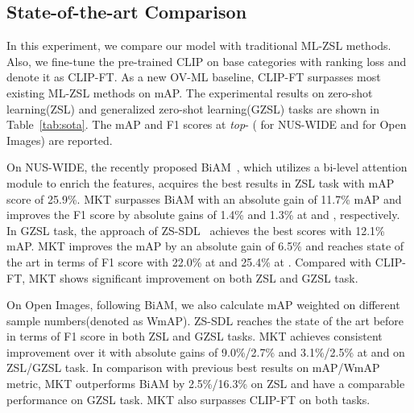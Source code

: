 \documentclass[letterpaper]{article} \usepackage{aaai23}  \usepackage{times}  \usepackage{helvet}  \usepackage{courier}  \usepackage[hyphens]{url}  \usepackage{graphicx} \urlstyle{rm} \def\UrlFont{\rm}  \usepackage{natbib}  \usepackage{caption} \frenchspacing  \setlength{\pdfpagewidth}{8.5in}  \setlength{\pdfpageheight}{11in}
\begin{document}
\subsection{State-of-the-art Comparison}

In this experiment, we compare our model with traditional ML-ZSL methods. 
Also, we fine-tune the pre-trained CLIP on base categories with ranking loss and denote it as CLIP-FT. 
As a new OV-ML baseline, CLIP-FT surpasses most existing ML-ZSL methods on mAP.
The experimental results on zero-shot learning(ZSL) and generalized zero-shot learning(GZSL) tasks are shown in Table~\ref{tab:sota}. 
The mAP and F1 scores at \textit{top}- ( for NUS-WIDE and
 for Open Images) are reported. 

On NUS-WIDE, the recently proposed BiAM~\cite{biam}, which utilizes a bi-level attention module to enrich the features, acquires the best results in ZSL task with mAP score of 25.9\%. 
MKT surpasses BiAM with an absolute gain of 11.7\% mAP and improves the F1 score by absolute gains of 1.4\% and 1.3\% at  and , respectively. 
In GZSL task, the approach of ZS-SDL~\cite{zssdl} achieves the best scores with 12.1\% mAP. 
MKT improves the mAP by an absolute gain of 6.5\% and reaches state of the art in terms of F1 score with 22.0\% at  and 25.4\% at .
Compared with CLIP-FT, MKT shows significant improvement on both ZSL and GZSL task.

On Open Images, following BiAM, we also calculate mAP weighted on different sample numbers(denoted as WmAP).
ZS-SDL reaches the state of the art before in terms of F1 score in both ZSL and GZSL tasks. 
MKT achieves consistent improvement over it with absolute gains of 9.0\%/2.7\% and 3.1\%/2.5\% at  and  on ZSL/GZSL task. 
In comparison with previous best results on mAP/WmAP metric, MKT outperforms BiAM by 2.5\%/16.3\% on ZSL and have a comparable performance on GZSL task. 
MKT also surpasses CLIP-FT on both tasks.
\end{document}
